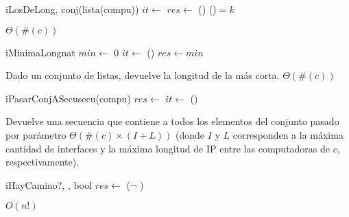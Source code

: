\begin{Algoritmos}
  \begin{algoritmo}{iLosDeLong}{, }{conj(lista(compu))}
     $it \gets$ 
    $res \gets$ \vacio{} 
    \While(){}{
      \If(){$ = k$}{
         
      }
       
    }
  \end{algoritmo}
  {} %
  {} %
  {$\Theta(\#(c))$} %
  {} %

  \begin{algoritmo}{iMinimaLong}{}{nat}
     $min \gets$ 0 
     $it \gets$  
    \While(){}{
       
    }
    $res \gets min$
  \end{algoritmo}
  \datosAlgoritmo
  {Dado un conjunto de listas, devuelve la longitud de la m\'as corta.} %
  {} %
  {} %
  {$\Theta(\#(c))$} %
  {} %
    
	\begin{algoritmo}{iPasarConjASecu}{}{secu(compu)}{}
		$res \gets$ \vacia{} 
		 $it \gets$  
		\While(){}{
			  		
		}
	\end{algoritmo}    
  \datosAlgoritmo
  {Devuelve una secuencia que contiene a todos los elementos del conjunto pasado por par\'{a}metro} %
  {} %
  {} %
  {$\Theta(\#(c) \times (I + L))$ (donde $I$ y $L$ corresponden a la m\'axima cantidad de interfaces y la m\'axima longitud de IP entre las computadoras de $c$, respectivamente).} %
  {} %
     
  \begin{algoritmo}{iHayCamino?}{, , }{bool}{}
    $res \gets$ ($\neg$ ) 
  \end{algoritmo}
  \datosAlgoritmo{} %
  {} %
  {} %
  {$O(n!)$} %
  {} %


\end{Algoritmos}
